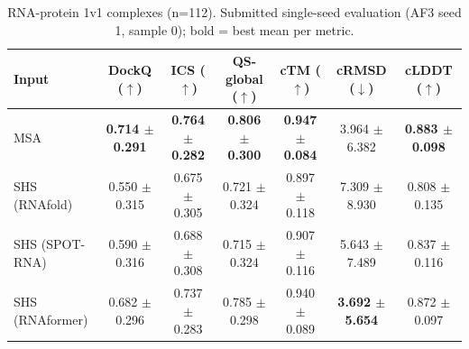 \begin{table}[htbp]
\centering
\caption{RNA-protein 1v1 complexes (n=112). Submitted single-seed evaluation (AF3 seed 1, sample 0); bold = best mean per metric.}
\label{tab:rna_protein_1v1_complexes}
\begin{tabular}{lcccccc}
\toprule
Input & DockQ ($\uparrow$) & ICS ($\uparrow$) & QS-global ($\uparrow$) & cTM ($\uparrow$) & cRMSD ($\downarrow$) & cLDDT ($\uparrow$) \\
\midrule
MSA & \textbf{0.714 $\pm$ 0.291} & \textbf{0.764 $\pm$ 0.282} & \textbf{0.806 $\pm$ 0.300} & \textbf{0.947 $\pm$ 0.084} & 3.964 $\pm$ 6.382 & \textbf{0.883 $\pm$ 0.098} \\
SHS (RNAfold) & 0.550 $\pm$ 0.315 & 0.675 $\pm$ 0.305 & 0.721 $\pm$ 0.324 & 0.897 $\pm$ 0.118 & 7.309 $\pm$ 8.930 & 0.808 $\pm$ 0.135 \\
SHS (SPOT-RNA) & 0.590 $\pm$ 0.316 & 0.688 $\pm$ 0.308 & 0.715 $\pm$ 0.324 & 0.907 $\pm$ 0.116 & 5.643 $\pm$ 7.489 & 0.837 $\pm$ 0.116 \\
SHS (RNAformer) & 0.682 $\pm$ 0.296 & 0.737 $\pm$ 0.283 & 0.785 $\pm$ 0.298 & 0.940 $\pm$ 0.089 & \textbf{3.692 $\pm$ 5.654} & 0.872 $\pm$ 0.097 \\
\bottomrule
\end{tabular}
\end{table}
